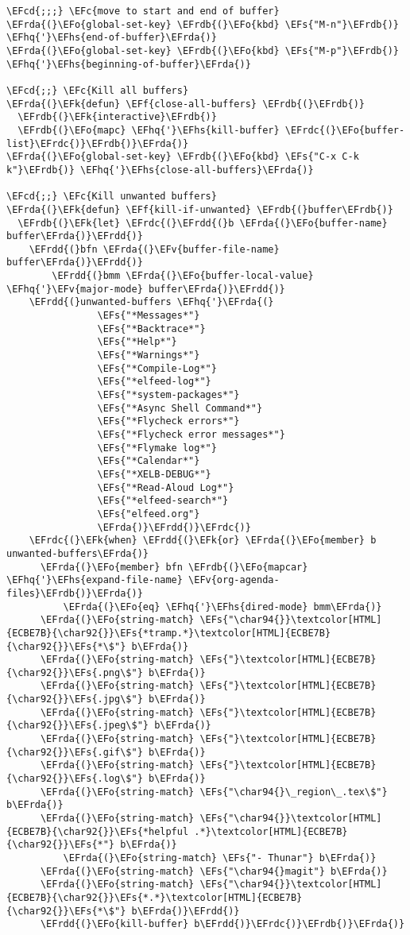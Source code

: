 \documentclass[a4wide,10pt]{article}
\newcommand{\EFc}[1]{\textcolor{EFc}{#1}} %
\newcommand{\EFcd}[1]{\textcolor{EFcd}{#1}} %
\newcommand{\EFs}[1]{\textcolor{EFs}{#1}} %
\newcommand{\EFk}[1]{\textcolor{EFk}{#1}} %
\newcommand{\EFf}[1]{\textcolor{EFf}{#1}} %
\newcommand{\EFv}[1]{\textcolor{EFv}{#1}} %
\newcommand{\EFo}[1]{\textcolor{EFo}{#1}} %
\newcommand{\EFhq}[1]{\textcolor{EFhq}{#1}} %
\newcommand{\EFhs}[1]{\textcolor{EFhs}{#1}} %
\newcommand{\EFrda}[1]{\textcolor{EFrda}{#1}} %
\newcommand{\EFrdb}[1]{\textcolor{EFrdb}{#1}} %
\newcommand{\EFrdc}[1]{\textcolor{EFrdc}{#1}} %
\newcommand{\EFrdd}[1]{\textcolor{EFrdd}{#1}} %
\begin{document}
\begin{Code}
\begin{Verbatim}
\EFcd{;;;} \EFc{move to start and end of buffer}
\EFrda{(}\EFo{global-set-key} \EFrdb{(}\EFo{kbd} \EFs{"M-n"}\EFrdb{)} \EFhq{'}\EFhs{end-of-buffer}\EFrda{)}
\EFrda{(}\EFo{global-set-key} \EFrdb{(}\EFo{kbd} \EFs{"M-p"}\EFrdb{)} \EFhq{'}\EFhs{beginning-of-buffer}\EFrda{)}

\EFcd{;;} \EFc{Kill all buffers}
\EFrda{(}\EFk{defun} \EFf{close-all-buffers} \EFrdb{(}\EFrdb{)}
  \EFrdb{(}\EFk{interactive}\EFrdb{)}
  \EFrdb{(}\EFo{mapc} \EFhq{'}\EFhs{kill-buffer} \EFrdc{(}\EFo{buffer-list}\EFrdc{)}\EFrdb{)}\EFrda{)}
\EFrda{(}\EFo{global-set-key} \EFrdb{(}\EFo{kbd} \EFs{"C-x C-k k"}\EFrdb{)} \EFhq{'}\EFhs{close-all-buffers}\EFrda{)}

\EFcd{;;} \EFc{Kill unwanted buffers}
\EFrda{(}\EFk{defun} \EFf{kill-if-unwanted} \EFrdb{(}buffer\EFrdb{)}
  \EFrdb{(}\EFk{let} \EFrdc{(}\EFrdd{(}b \EFrda{(}\EFo{buffer-name} buffer\EFrda{)}\EFrdd{)}
	\EFrdd{(}bfn \EFrda{(}\EFv{buffer-file-name} buffer\EFrda{)}\EFrdd{)}
        \EFrdd{(}bmm \EFrda{(}\EFo{buffer-local-value} \EFhq{'}\EFv{major-mode} buffer\EFrda{)}\EFrdd{)}
	\EFrdd{(}unwanted-buffers \EFhq{'}\EFrda{(}
			    \EFs{"*Messages*"}
			    \EFs{"*Backtrace*"}
			    \EFs{"*Help*"}
			    \EFs{"*Warnings*"}
			    \EFs{"*Compile-Log*"}
			    \EFs{"*elfeed-log*"}
			    \EFs{"*system-packages*"}
			    \EFs{"*Async Shell Command*"}
			    \EFs{"*Flycheck errors*"}
			    \EFs{"*Flycheck error messages*"}
			    \EFs{"*Flymake log*"}
			    \EFs{"*Calendar*"}
			    \EFs{"*XELB-DEBUG*"}
			    \EFs{"*Read-Aloud Log*"}
			    \EFs{"*elfeed-search*"}
			    \EFs{"elfeed.org"}
			    \EFrda{)}\EFrdd{)}\EFrdc{)}
    \EFrdc{(}\EFk{when} \EFrdd{(}\EFk{or} \EFrda{(}\EFo{member} b unwanted-buffers\EFrda{)}
	  \EFrda{(}\EFo{member} bfn \EFrdb{(}\EFo{mapcar} \EFhq{'}\EFhs{expand-file-name} \EFv{org-agenda-files}\EFrdb{)}\EFrda{)}
          \EFrda{(}\EFo{eq} \EFhq{'}\EFhs{dired-mode} bmm\EFrda{)}
	  \EFrda{(}\EFo{string-match} \EFs{"\char94{}}\textcolor[HTML]{ECBE7B}{\char92{}}\EFs{*tramp.*}\textcolor[HTML]{ECBE7B}{\char92{}}\EFs{*\$"} b\EFrda{)}
	  \EFrda{(}\EFo{string-match} \EFs{"}\textcolor[HTML]{ECBE7B}{\char92{}}\EFs{.png\$"} b\EFrda{)}
	  \EFrda{(}\EFo{string-match} \EFs{"}\textcolor[HTML]{ECBE7B}{\char92{}}\EFs{.jpg\$"} b\EFrda{)}
	  \EFrda{(}\EFo{string-match} \EFs{"}\textcolor[HTML]{ECBE7B}{\char92{}}\EFs{.jpeg\$"} b\EFrda{)}
	  \EFrda{(}\EFo{string-match} \EFs{"}\textcolor[HTML]{ECBE7B}{\char92{}}\EFs{.gif\$"} b\EFrda{)}
	  \EFrda{(}\EFo{string-match} \EFs{"}\textcolor[HTML]{ECBE7B}{\char92{}}\EFs{.log\$"} b\EFrda{)}
	  \EFrda{(}\EFo{string-match} \EFs{"\char94{}\_region\_.tex\$"} b\EFrda{)}
	  \EFrda{(}\EFo{string-match} \EFs{"\char94{}}\textcolor[HTML]{ECBE7B}{\char92{}}\EFs{*helpful .*}\textcolor[HTML]{ECBE7B}{\char92{}}\EFs{*"} b\EFrda{)}
          \EFrda{(}\EFo{string-match} \EFs{"- Thunar"} b\EFrda{)}
	  \EFrda{(}\EFo{string-match} \EFs{"\char94{}magit"} b\EFrda{)}
	  \EFrda{(}\EFo{string-match} \EFs{"\char94{}}\textcolor[HTML]{ECBE7B}{\char92{}}\EFs{*.*}\textcolor[HTML]{ECBE7B}{\char92{}}\EFs{*\$"} b\EFrda{)}\EFrdd{)}
      \EFrdd{(}\EFo{kill-buffer} b\EFrdd{)}\EFrdc{)}\EFrdb{)}\EFrda{)}


\end{Verbatim}
\end{Code}
\end{document}
